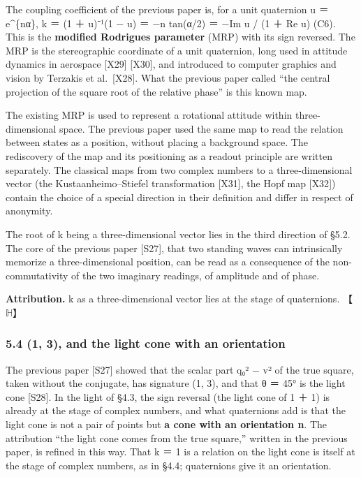 \documentclass[
  a4paper,
]{article}
\begin{document}
The coupling coefficient of the previous paper is, for a unit quaternion
u ＝ e\^{}\{nα\}, k ＝ (1 ＋ u)⁻¹(1 − u) ＝ −n tan(α/2) ＝ −Im u / (1 ＋
Re u) (C6). This is the \textbf{modified Rodrigues parameter} (MRP) with
its sign reversed. The MRP is the stereographic coordinate of a unit
quaternion, long used in attitude dynamics in aerospace {[}X29{]}
{[}X30{]}, and introduced to computer graphics and vision by Terzakis et
al.~{[}X28{]}. What the previous paper called ``the central projection
of the square root of the relative phase'' is this known map.

The existing MRP is used to represent a rotational attitude within
three-dimensional space. The previous paper used the same map to read
the relation between states as a position, without placing a background
space. The rediscovery of the map and its positioning as a readout
principle are written separately. The classical maps from two complex
numbers to a three-dimensional vector (the Kustaanheimo--Stiefel
transformation {[}X31{]}, the Hopf map {[}X32{]}) contain the choice of
a special direction in their definition and differ in respect of
anonymity.

The root of k being a three-dimensional vector lies in the third
direction of §5.2. The core of the previous paper {[}S27{]}, that two
standing waves can intrinsically memorize a three-dimensional position,
can be read as a consequence of the non-commutativity of the two
imaginary readings, of amplitude and of phase.

\textbf{Attribution.} k as a three-dimensional vector lies at the stage
of quaternions. 【\(\mathbb{H}\)】

\subsubsection{5.4 (1, 3), and the light cone with an
orientation}\label{and-the-light-cone-with-an-orientation}

The previous paper {[}S27{]} showed that the scalar part q₀² −
\textbar v\textbar² of the true square, taken without the conjugate, has
signature (1, 3), and that θ ＝ 45° is the light cone {[}S28{]}. In the
light of §4.3, the sign reversal (the light cone of 1 ＋ 1) is already
at the stage of complex numbers, and what quaternions add is that the
light cone is not a pair of points but \textbf{a cone with an
orientation n}. The attribution ``the light cone comes from the true
square,'' written in the previous paper, is refined in this way. That
\textbar k\textbar{} ＝ 1 is a relation on the light cone is itself at
the stage of complex numbers, as in §4.4; quaternions give it an
orientation.
\end{document}
